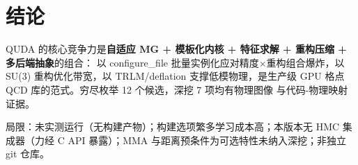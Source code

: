 \documentclass[UTF8]{ctexart}
\begin{document}
\section{结论}
\begin{conclbox}
QUDA 的核心竞争力是\textbf{自适应 MG + 模板化内核 + 特征求解 + 重构压缩 + 多后端抽象}的组合：
以 configure\_file 批量实例化应对精度×重构组合爆炸，以 SU(3) 重构优化带宽，以 TRLM/deflation
支撑低模物理，是生产级 GPU 格点 QCD 库的范式。穷尽枚举 12 个候选，深挖 7 项均有物理图像
与代码-物理映射证据。
\end{conclbox}
\begin{warnbox}
\textcolor{warn}{局限：}未实测运行（无构建产物）；构建选项繁多学习成本高；本版本无 HMC
集成器（力经 C API 暴露）；MMA 与距离预条件为可选特性未纳入深挖；非独立 git 仓库。
\end{warnbox}
\end{document}
